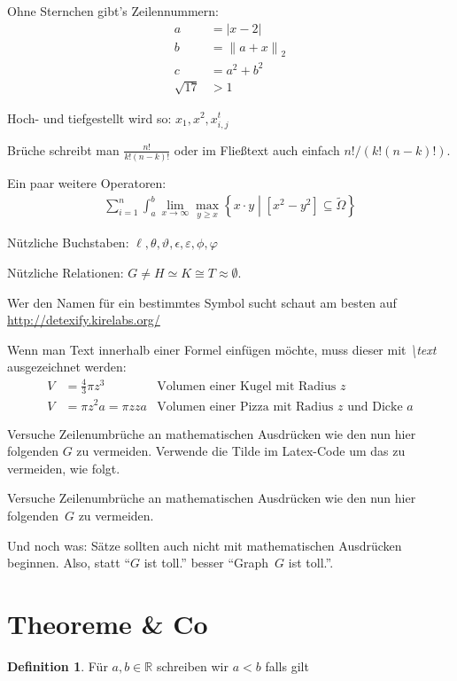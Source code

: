 \documentclass[a4paper,titlepage,onecolumn,twoside,12pt,ngerman,titlepage=firstiscover]{scrbook}
\theoremstyle{plain} %
\theoremstyle{definition} %
\newtheorem{definition}[theorem]{Definition}
\theoremstyle{remark} %
\theoremstyle{plain}
\newcommand{\RR}{\mathbb{R}} %
\newcommand\abs[1]{\left|#1\right|} %
\newcommand\norm[2]{\left\lVert#1\right\rVert_{#2}} %
\newcommand\enorm[1]{\norm{#1}{2}} %
\begin{document}
Ohne Sternchen gibt's Zeilennummern:
\begin{align}
a &= \abs{x - 2}\\
b &= \enorm{a + x}\\
c &= a^2 + b^2 \\
\sqrt{17} &> 1 \label{eq:wurzel}
\end{align}

Hoch- und tiefgestellt wird so: $x_1, x^2, x_{i,j}^t$

Brüche schreibt man $\frac{n!}{k!(n-k)!}$ oder im Fließtext auch einfach $n!/(k!(n-k)!)$.

Ein paar weitere Operatoren:
\begin{align*}
\sum_{i=1}^n \int_a^b \lim_{x \to \infty} \max_{y \geq x} \left\{ x \cdot y \middle| \left[ x^2 - y^2 \right] \subseteq \tilde{\Omega} \right\}
\end{align*}

Nützliche Buchstaben: $\ell, \theta, \vartheta, \epsilon, \varepsilon, \phi, \varphi$

Nützliche Relationen: $G \neq H \simeq K \cong T \approx \emptyset$.

Wer den Namen für ein bestimmtes Symbol sucht schaut am besten auf \url{http://detexify.kirelabs.org/}

Wenn man Text innerhalb einer Formel einfügen möchte, muss dieser mit \textit{\textbackslash text} ausgezeichnet werden:
\begin{align*}
V &= \frac{4}{3} \pi z^3 & \text{Volumen einer Kugel mit Radius $z$}\\
V &= \pi z^2 a = \pi zza & \text{Volumen einer Pizza mit Radius $z$ und Dicke $a$}
\end{align*}

Versuche Zeilenumbrüche an mathematischen Ausdrücken wie den nun hier folgenden $G$ zu vermeiden. 
Verwende die Tilde im Latex-Code um das zu vermeiden, wie folgt.

Versuche Zeilenumbrüche an mathematischen Ausdrücken wie den nun hier folgenden~$G$ zu vermeiden. 

Und noch was: Sätze sollten auch nicht mit mathematischen Ausdrücken beginnen.
Also, statt \enquote{$G$ ist toll.} besser \enquote{Graph~$G$ ist toll.}.


\section{Theoreme \& Co}


\begin{definition}\label{def:smaller}
Für $a, b \in \RR$ schreiben wir $a < b$ falls gilt
\end{definition}
\end{document}
